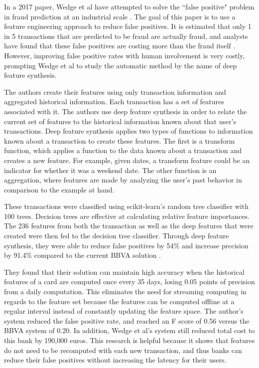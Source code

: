 \documentclass[midd]{thesis}
\begin{document}
In a 2017 paper, Wedge et al have attempted to solve the ``false positive" problem in fraud prediction at an industrial scale \cite{Wedge}. The goal of this paper is to use a feature engineering approach to reduce false positives. It is estimated that only 1 in 5 transactions that are predicted to be fraud are actually fraud, and analysts have found that these false positives are costing more than the fraud itself \cite{Wedge}. However, improving false positive rates with human involvement is very costly, prompting Wedge et al to study the automatic method by the name of deep feature synthesis.  

The authors create their features using only transaction information and aggregated historical information. Each transaction has a set of features associated with it. The authors use deep feature synthesis in order to relate the current set of features to the historical information known about that user's transactions. Deep feature synthesis applies two types of functions to information known about a transaction to create these features. The first is a transform function, which applies a function to the data known about a transaction and creates a new feature. For example, given dates, a transform feature could be an indicator for whether it was a weekend date. The other function is an aggregation, where features are made by analyzing the user's past behavior in comparison to the example at hand. 

These transactions were classified using scikit-learn's random tree classifier with 100 trees. Decision trees are effective at calculating relative feature importances. The 236 features from both the transaction as well as the deep features that were created were then fed to the decision tree classifier. Through deep feature synthesis, they were able to reduce false positives by 54\%  and increase precision by 91.4\% compared to the current BBVA solution \cite{Wedge}. 

They found that their solution can maintain high accuracy when the historical features of a card are computed once every 35 days, losing 0.05 points of precision from a daily computation. This eliminates the need for streaming computing in regards to the feature set because the features can be computed offline at a regular interval instead of constantly updating the feature space. The author's system reduced the false positive rate, and reached an F score of 0.56 versus the BBVA system of 0.20. In addition, Wedge et al's system still reduced total cost to this bank by 190,000 euros. This research is helpful because it shows that features do not need to be recomputed with each new transaction, and thus banks can reduce their false positives without increasing the latency for their users.
\end{document}
